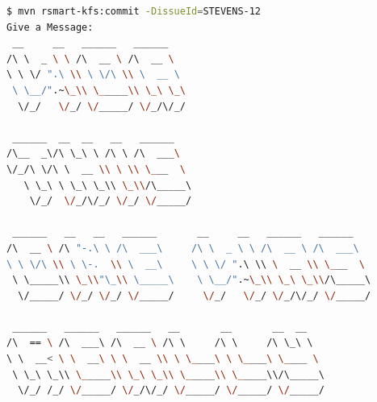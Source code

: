 \documentclass[12pt,notitlepage]{article}
\begin{document}
\begin{lstlisting}[language=bash,caption={Commit a change to an issue}]
$ mvn rsmart-kfs:commit -DissueId=STEVENS-12
Give a Message:
 __     __   ______   ______                                      
/\ \  _ \ \ /\  __ \ /\  __ \                                     
\ \ \/ ".\ \\ \ \/\ \\ \  __ \                                    
 \ \__/".~\_\\ \_____\\ \_\ \_\                                   
  \/_/   \/_/ \/_____/ \/_/\/_/                                   
                                                                  
 ______  __  __   __   ______                                     
/\__  _\/\ \_\ \ /\ \ /\  ___\                                    
\/_/\ \/\ \  __ \\ \ \\ \___  \                                   
   \ \_\ \ \_\ \_\\ \_\\/\_____\                                  
    \/_/  \/_/\/_/ \/_/ \/_____/                                  
                                                                  
 ______   __   __   ______       __     __   ______   ______      
/\  __ \ /\ "-.\ \ /\  ___\     /\ \  _ \ \ /\  __ \ /\  ___\     
\ \ \/\ \\ \ \-.  \\ \  __\     \ \ \/ ".\ \\ \  __ \\ \___  \    
 \ \_____\\ \_\\"\_\\ \_____\    \ \__/".~\_\\ \_\ \_\\/\_____\   
  \/_____/ \/_/ \/_/ \/_____/     \/_/   \/_/ \/_/\/_/ \/_____/   
                                                                  
 ______   ______   ______   __       __       __  __              
/\  == \ /\  ___\ /\  __ \ /\ \     /\ \     /\ \_\ \             
\ \  __< \ \  __\ \ \  __ \\ \ \____\ \ \____\ \____ \            
 \ \_\ \_\\ \_____\\ \_\ \_\\ \_____\\ \_____\\/\_____\           
  \/_/ /_/ \/_____/ \/_/\/_/ \/_____/ \/_____/ \/_____/           
                                                                  

\end{lstlisting}
\end{document}

